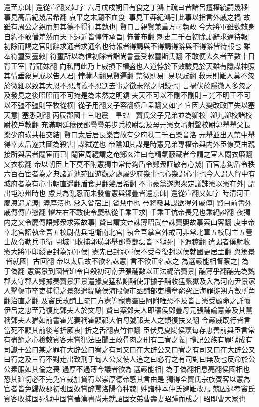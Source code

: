 還至京師|{
	還從宣翻又如字}
六月戊戍朔日有食之丁鴻上疏曰昔諸呂擅權統嗣幾移|{
	事見高后紀幾居希翻}
哀平之末廟不血食|{
	事見王莽紀鴻引此事以指言外戚之禍}
故雖有周公之親而無其德不得行其埶也|{
	賢曰言親賢兼重方可執政}
今大將軍雖欲敕身自約不敢僭差然而天下遠近皆惶怖承旨|{
	怖普布翻}
刺史二千石初除謁辭求通待報|{
	初除而謁之官則辭求通者求通名也待報者得謁與不得謁得辭與不得辭皆待報也}
雖奉符璽受臺敕|{
	符璽所以為信初除者詣尚書臺受敕璽斯氏翻}
不敢便去久者至數十日背王室|{
	背蒲妹翻}
向私門此乃上威損下權盛也人道悖於下效驗見於天雖有隱謀神照其情垂象見戒以告人君|{
	悖蒲内翻見賢遍翻}
禁微則易|{
	易以䜴翻}
救末則難人莫不忽於微細以致其大恩不忍誨義不忍割去事之徵未然之明鏡也|{
	言禍伏於隱微人多忽之及發見之後昭昭而不可掩是為未然之明鏡}
夫天不可以不剛不剛則三光不明王不可以不彊不彊則宰牧從横|{
	從子用翻又子容翻横戶孟翻又如字}
宜因大變改政匡失以塞天意|{
	塞悉則翻}
丙辰郡國十三地震　旱蝗　竇氏父子兄弟並為卿校|{
	卿九卿校諸校尉校戶教翻}
充滿朝廷穰侯鄧疊疊弟步兵校尉磊及母元憲女壻射聲校尉郭舉舉父長樂少府璜共相交結|{
	賢曰太后居長樂宫故有少府秩二千石樂音洛}
元舉並出入禁中舉得幸太后遂共圖為殺害|{
	謀弑逆也}
帝隂知其謀是時憲兄弟專權帝與内外臣僚莫由親接所與居者閹宦而已|{
	閹宦周禮謂之奄鄭玄注曰奄精氣蔽藏者今謂之宦人閹衣廉翻又衣檢翻}
帝以朝臣上下莫不附憲獨中常侍鉤盾令鄭衆謹敏有心幾|{
	百官志鉤盾令秩六百石宦者為之典諸近池苑囿遊觀之處屬少府幾事也心幾謂心事也今人謂人胷中有城府者為有心事朝直遥翻盾食尹翻幾居希翻}
不事豪黨遂與衆定議誅憲以憲在外|{
	謂出屯凉州時也}
慮其為亂忍而未發會憲與鄧疊皆還京師|{
	還從宣翻又如字}
時清河王慶恩遇尤渥|{
	渥厚漬也}
常入省宿止|{
	省禁中也}
帝將發其謀欲得外戚傳|{
	賢曰前書外戚傳傳直戀翻}
懼左右不敢使令慶私從千乘王求|{
	千乘王伉帝長兄也乘繩證翻}
夜獨内之又令慶傳語鄭衆求索故事|{
	賢曰謂文帝誅薄昭武帝誅竇嬰故事索山客翻}
庚申帝幸北宫詔執金吾五校尉勒兵屯衛南北宫|{
	執金吾掌宫外戒司非常北軍五校尉主五營士故令勒兵屯衛}
閉城門收捕郭璜郭舉鄧疊鄧磊皆下獄死|{
	下遐稼翻}
遣謁者僕射收憲大將軍印綬更封為冠軍侯|{
	憲先已封冠軍侯不受今復封以侯就國更居孟翻}
與篤景皆就國|{
	古回翻}
帝以太后故不欲名誅憲|{
	言不欲正名誅之}
為選嚴能相督察之|{
	為于偽翻}
憲篤景到國皆廹令自殺初河南尹張酺數以正法繩治竇景|{
	酺薄乎翻酺先為魏郡太守郡人鄭據奏竇景罪景遣掾夏猛私謝酺使罪據子酺收猛繫獄及入為河南尹景家人擊傷市卒吏捕得之景怒遣緹騎侯海毆傷市丞酺部吏楊章窮究正海罪徙朔方數所角翻治直之翻}
及竇氏敗酺上疏曰方憲等寵貴羣臣阿附唯恐不及皆言憲受顧命之託懷伊呂之忠至乃復比鄧夫人於文母|{
	賢曰案鄧夫人即穰侯鄧疊母元張酺論憲兼及其黨稱鄧夫人猶如前書霍光妻稱霍顯祁大伯母號祁夫人之類復扶又翻}
今嚴威既行皆言當死不顧其前後考折厥衷|{
	折之舌翻衷竹仲翻}
臣伏見夏陽侯瓌每存忠善前與臣言常有盡節之心檢敇賓客未嘗犯法臣聞王政骨肉之刑有三宥之義|{
	禮記公族有罪獄成有司讞于公曰某之罪在大辟公曰宥之有司又曰在大辟公又曰宥之有司又曰在大辟公又曰宥之及三宥不對走出致刑于甸人公又使人追之曰必宥之有司對曰無及也反命於公公素服如其倫之喪}
過厚不過薄今議者欲為選嚴能相|{
	為于偽翻相息亮翻侯國相也}
恐其廹切必不完免宜裁加貸宥以崇厚德帝感其言由是獨得全竇氏宗族賓客以憲為官者皆免歸故郡初班固奴嘗醉罵洛陽令种兢|{
	姓譜种本仲氏避難改焉}
兢因逮考竇氏賓客收捕固死獄中固嘗著漢書尚未就詔固女弟曹壽妻昭踵而成之|{
	昭即曹大家也}


